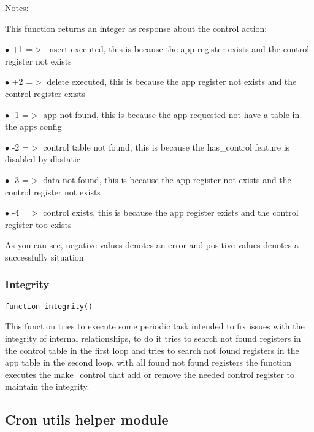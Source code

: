 \documentclass[a4paper]{article}
\begin{document}
Notes:

This function returns an integer as response about the control action:

\begin{compactitem}
\item[\color{myblue}$\bullet$] +1 =$>$ insert executed, this is because the app register exists and the control register not exists
\item[\color{myblue}$\bullet$] +2 =$>$ delete executed, this is because the app register not exists and the control register exists
\item[\color{myblue}$\bullet$] -1 =$>$ app not found, this is because the app requested not have a table in the apps config
\item[\color{myblue}$\bullet$] -2 =$>$ control table not found, this is because the has\_control feature is disabled by dbstatic
\item[\color{myblue}$\bullet$] -3 =$>$ data not found, this is because the app register not exists and the control register not exists
\item[\color{myblue}$\bullet$] -4 =$>$ control exists, this is because the app register exists and the control register too exists
\end{compactitem}

As you can see, negative values denotes an error and positive values denotes a successfully situation

\hypertarget{toc399}{}
\subsubsection{Integrity}

\begin{lstlisting}
function integrity()
\end{lstlisting}

This function tries to execute some periodic task intended to fix issues with
the integrity of internal relationships, to do it tries to search not found
registers in the control table in the first loop and tries to search not found
registers in the app table in the second loop, with all found not found registers
the function executes the make\_control that add or remove the needed control
register to maintain the integrity.

\hypertarget{toc400}{}
\subsection{Cron utils helper module}
\end{document}
